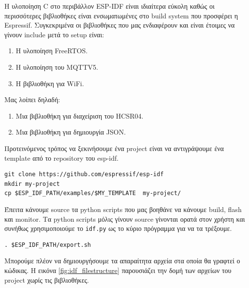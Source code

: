 Η υλοποίηση C στο περιβάλλον ESP-IDF είναι ιδιαίτερα εύκολη καθώς οι
περισσότερες βιβλιοθήκες είναι ενσωματωμένες στο build system που
προσφέρει η Espressif. Συγκεκριμένα οι βιβλιοθήκες που μας ενδιαφέρουν και
είναι έτοιμες να γίνουν include μετά το setup είναι:

\begin{enumerate}
        \item Η υλοποίηση FreeRTOS.
        \item H υλοποίηση του MQTTV5.
        \item Η βιβλιοθήκη για WiFi.
\end{enumerate}

Μας λοίπει δηλαδή:

\begin{enumerate}
        \item Μια βιβλιοθήκη για διαχείριση του HCSR04.
        \item Μια βιβλιοθήκη για δημιουργία JSON.
\end{enumerate}

Προτεινόμενος τρόπος να ξεκινήσουμε ένα
project είναι να αντιγράψουμε ένα template από το repository
του esp-idf.

\begin{lstlisting}
git clone https://github.com/espressif/esp-idf
mkdir my-project
cp $ESP_IDF_PATH/examples/$MY_TEMPLATE  my-project/
\end{lstlisting}

Έπειτα κάνουμε source τα python scripts που μας βοηθάνε
να κάνουμε build, flash και monitor. Τα python scripts
μόλις γίνουν source γίνονται ορατά στον χρήστη και συνήθως
χρησιμοποιούμε το \verb|idf.py| ως το κύριο πρόγραμμα
για να τα τρέξουμε.

\begin{lstlisting}
. $ESP_IDF_PATH/export.sh
\end{lstlisting}

Μπορούμε πλέον να δημιουργήσουμε τα απαραίτητα αρχεία 
στα οποία θα γραφτεί ο κώδικας. Η εικόνα \ref{fig:idf_filestructure}
παρουσιάζει την δομή των αρχείων του project χωρίς τις βιβλιοθήκες.

